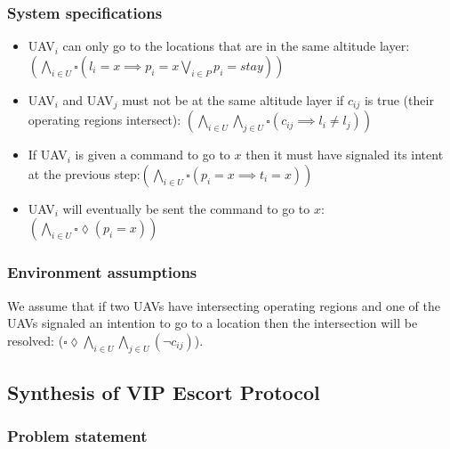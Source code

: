 \documentclass[]{article}
\begin{document}
\subsubsection{System specifications}\label{system-specifications}

\begin{itemize}
\itemsep1pt\parskip0pt
\item
  UAV$_{i}$ can only go to the locations that are in the same altitude
  layer: $(\bigwedge\limits_{i \in U} \square (l_{i} = x \implies p_{i} = x \bigvee\limits_{i \in P} p_{i} = stay))$
\item
  UAV$_{i}$ and UAV$_{j}$ must not be at the same altitude layer if
  $c_{ij}$ is true (their operating regions intersect): $(\bigwedge\limits_{i\in U} \bigwedge\limits_{j\in U} \square (c_{ij} \implies l_{i} \neq l_{j}))$
\item
  If UAV$_{i}$ is given a command to go to $x$ then it must have
  signaled its intent at the previous step:$(\bigwedge\limits_{i \in U} \square (p_{i} = x \implies t_{i} = x))$
\item
  UAV$_{i}$ will eventually be sent the command to go to $x$: $(\bigwedge\limits_{i \in U} \square \lozenge (p_{i} = x))$
\end{itemize}

\subsubsection{Environment assumptions}\label{environment-assumptions}


We assume that if two UAVs have intersecting operating regions and one
of the UAVs signaled an intention to go to a location then the
intersection will be resolved: ($\square  \lozenge \bigwedge\limits_{i \in U}\bigwedge\limits_{j \in U} ( \lnot c_{ij})$).


\subsection{Synthesis of VIP Escort Protocol}\label{vip-escort}

\subsubsection{Problem statement}\label{problem-statement}
\end{document}
